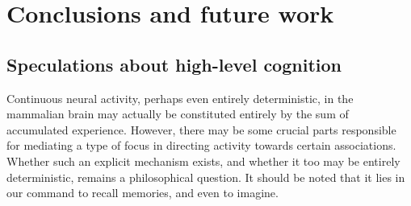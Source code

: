 
\chapter{Conclusions and future work}

\section{Speculations about high-level cognition}
Continuous neural activity, perhaps even entirely deterministic, in the mammalian brain may actually be constituted entirely by the sum of accumulated experience. However, there may be some crucial parts responsible for mediating a type of focus in directing activity towards certain associations. Whether such an explicit mechanism exists, and whether it too may be entirely deterministic, remains a philosophical question. It should be noted that it lies in our command to recall memories, and even to imagine.

\cleardoublepage